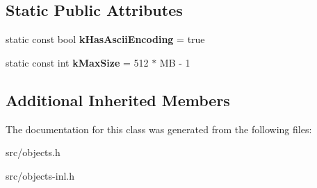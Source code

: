 \subsection*{Static Public Attributes}
\begin{DoxyCompactItemize}
\item 
\hypertarget{classv8_1_1internal_1_1_seq_one_byte_string_a34e2992604474781a05482bf902babd2}{}static const bool {\bfseries k\+Has\+Ascii\+Encoding} = true\label{classv8_1_1internal_1_1_seq_one_byte_string_a34e2992604474781a05482bf902babd2}

\item 
\hypertarget{classv8_1_1internal_1_1_seq_one_byte_string_af5744767fa5422c6d3a5b046f5f7090a}{}static const int {\bfseries k\+Max\+Size} = 512 $\ast$ M\+B -\/ 1\label{classv8_1_1internal_1_1_seq_one_byte_string_af5744767fa5422c6d3a5b046f5f7090a}

\end{DoxyCompactItemize}
\subsection*{Additional Inherited Members}


The documentation for this class was generated from the following files\+:\begin{DoxyCompactItemize}
\item 
src/objects.\+h\item 
src/objects-\/inl.\+h\end{DoxyCompactItemize}
